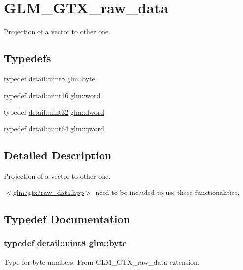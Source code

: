 \hypertarget{group__gtx__raw__data}{}\section{G\+L\+M\+\_\+\+G\+T\+X\+\_\+raw\+\_\+data}
\label{group__gtx__raw__data}


Projection of a vector to other one.  


\subsection*{Typedefs}
\begin{DoxyCompactItemize}
\item 
typedef \hyperlink{stb__image_8c_adde6aaee8457bee49c2a92621fe22b79}{detail\+::uint8} \hyperlink{group__gtx__raw__data_gacd7fe1f2ad60a57f7d7ad4f1e6836efd}{glm\+::byte}
\item 
typedef \hyperlink{stb__image_8c_a05f6b0ae8f6a6e135b0e290c25fe0e4e}{detail\+::uint16} \hyperlink{group__gtx__raw__data_ga5617a479d471021b5c773c5e969ba46d}{glm\+::word}
\item 
typedef \hyperlink{stb__image_8c_a1134b580f8da4de94ca6b1de4d37975e}{detail\+::uint32} \hyperlink{group__gtx__raw__data_ga1fc2589df6d44e923cd1820cf14805cf}{glm\+::dword}
\item 
typedef detail\+::uint64 \hyperlink{group__gtx__raw__data_ga32447af289e879589883c9b7e3be1246}{glm\+::qword}
\end{DoxyCompactItemize}


\subsection{Detailed Description}
Projection of a vector to other one. 

$<$\hyperlink{raw__data_8hpp}{glm/gtx/raw\+\_\+data.\+hpp}$>$ need to be included to use these functionalities. 

\subsection{Typedef Documentation}
\hypertarget{group__gtx__raw__data_gacd7fe1f2ad60a57f7d7ad4f1e6836efd}{}
\subsubsection[{byte}]{\setlength{\rightskip}{0pt plus 5cm}typedef {\bf detail\+::uint8} {\bf glm\+::byte}}\label{group__gtx__raw__data_gacd7fe1f2ad60a57f7d7ad4f1e6836efd}
Type for byte numbers. From G\+L\+M\+\_\+\+G\+T\+X\+\_\+raw\+\_\+data extension. \hypertarget{group__gtx__raw__data_ga1fc2589df6d44e923cd1820cf14805cf}{}
